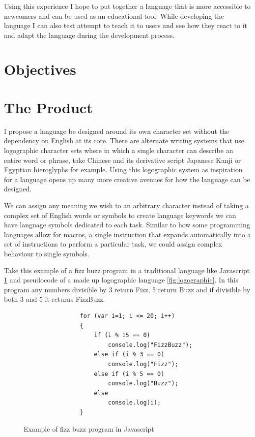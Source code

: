 \documentclass[12pt]{article}
\begin{document}
Using this experience I hope to put together a language that is more accessible to newcomers and can be used as an educational tool.
While developing the language I can also test attempt to teach it to users and see how they react to it and adapt the language during the development process.


\section{Objectives}

\section{The Product}

I propose a language be designed around its own character set without the dependency on English at its core.
There are alternate writing systems that use logographic character sets where in which a single
character can describe an entire word or phrase, take Chinese and its derivative script Japanese Kanji or Egyptian hieroglyphs for example.
Using this logographic system as inspiration for a language opens up many more creative
avenues for how the language can be designed. 

We can assign any meaning we wish to an arbitrary character
instead of taking a complex set of English words or symbols to create language keywords we can have language symbols dedicated to each task.
Similar to how some programming languages allow for macros, a single instruction that expands automatically into a set of instructions to perform a particular task,
we could assign complex behaviour to single symbols.

Take this example of a fizz buzz program in a traditional language like Javascript \ref{fig:javascript} and pseudocode of a made up logographic language \ref{fig:logographic}.
In this program any numbers divisible by 3 return Fizz, 5 return Buzz and if divisible by both 3 and 5 it returns FizzBuzz.

\begin{figure}[h]
    \caption{Example of fizz buzz program in Javascript}
    \centering
    \begin{verbatim}
                for (var i=1; i <= 20; i++)
                {
                    if (i % 15 == 0)
                        console.log("FizzBuzz");
                    else if (i % 3 == 0)
                        console.log("Fizz");
                    else if (i % 5 == 0)
                        console.log("Buzz");
                    else
                        console.log(i);
                }
    \end{verbatim}
    \label{fig:javascript}
\end{figure}    
\end{document}
